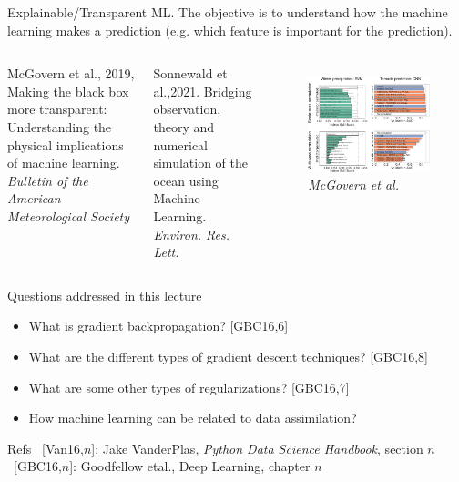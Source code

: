 \documentclass[handout]{beamer}
\newcommand{\rref}[1][]{\hfill{\scriptsize\textit{#1}}}
\begin{document}
\begin{frame}{Explainable/Transparent ML.}
The objective is to understand how the machine learning makes a prediction (e.g. which feature is important for the prediction).

\begin{columns}

{\footnotesize

    McGovern et al., 2019, Making the black box more transparent: Understanding the physical implications of machine learning. {\it Bulletin of the American Meteorological Society}\\
    \vspace{1em}

    Sonnewald  et al.,2021. Bridging observation, theory and numerical simulation of the ocean using Machine Learning. {\it Environ. Res. Lett.} 
    }
    

\begin{figure}
    \centering
    \includegraphics[width=.5\textwidth]{fig/L3/full-bams-d-18-0195.1-f3.jpg}\\
\rref[McGovern et al.]
\end{figure}
\end{columns}

\end{frame}



\begin{frame}[fragile]{Questions addressed in this lecture}
    \begin{itemize}
        \item What is gradient backpropagation? [GBC16,6]
        \item What are the different types of gradient descent techniques? [GBC16,8]
        \item What are some other types of regularizations? [GBC16,7]
        \item How machine learning can be related to data assimilation?
    \end{itemize}

\begin{footnotesize}
\begin{block}{Refs}
~[Van16,$n$]: Jake VanderPlas, \textit{Python Data Science Handbook}, section $n$\\
~[GBC16,$n$]: Goodfellow etal., Deep Learning, chapter $n$
\end{block}
\end{footnotesize}
\end{frame}
\end{document}
